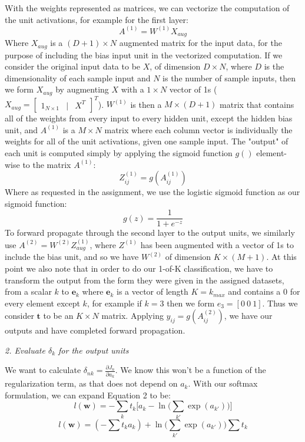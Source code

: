 \documentclass[10pt]{article}
\begin{document}
With the weights represented as matrices, we can vectorize the computation of the unit activations, for example for the first layer:
%
%
\begin{equation}
A^{(1)} = W^{(1)} X_{aug}
\end{equation}
%
%
Where $X_{aug}$ is a $(D+1) \times N$ augmented matrix for the input data, for the purpose of including the bias input unit in the vectorized computation.  If we consider the original input data to be $X$, of dimension $D \times N$, where $D$ is the dimensionality of each sample input and $N$ is the number of sample inputs, then we form $X_{aug}$ by augmenting $X$ with a $1 \times N$ vector of 1s ($X_{aug} = \begin{bmatrix} 1_{N \times 1} &| & X^T\end{bmatrix} ^T$).  $W^{(1)}$ is then a $M \times (D+1)$ matrix that contains all of the weights from every input to every hidden unit, except the hidden bias unit, and $A^{(1)}$ is a $M \times N$ matrix where each column vector is individually the weights for all of the unit activations, given one sample input.  The "output" of each unit is computed simply by applying the sigmoid function $g()$ element-wise to the matrix $A^{(1)}$:
%
%
\begin{equation}
Z^{(1)}_{ij} = g(A^{(1)}_{ij})
\end{equation}
%
%
Where as requested in the assignment, we use the logistic sigmoid function as our sigmoid function:
%
%
\begin{equation}
g(z) = \frac{1}{1 + e^{-z}}
\end{equation}
%
%
To forward propagate through the second layer to the output units, we similarly use $A^{(2)} = W^{(2)} Z_{aug}^{(1)}$, where $Z^{(1)}$ has been augmented with a vector of 1s to include the bias unit, and so we have $W^{(2)}$ of dimension $K \times (M+1)$.  At this point we also note that in order to do our 1-of-K classification, we have to transform the output from the form they were given in the assigned datasets, from a scalar $k$ to $\mathbf{e}_k$ where $\mathbf{e}_k$ is a vector of length $K = k_{max}$ and contains a 0 for every element except $k$, for example if $k=3$ then we form $e_3 = [0 \ 0 \  1]$.  Thus we consider $\mathbf{t}$ to be an $K \times N$ matrix.  Applying $y_{ij} = g(A^{(2)}_{ij})$, we have our outputs and have completed forward propagation.

\textit{2. Evaluate $\delta_k$ for the output units}

We want to calculate $\delta_{nk} = \frac{\partial J_n}{\partial a_k}$.  We know this won't be a function of the regularization term, as that does not depend on $a_k$.  With our softmax formulation, we can expand Equation 2 to be:
%
%
\begin{equation}
l(\mathbf{w}) = - \sum_k t_k \big[ a_k - \ln \big( \sum_{k'} \exp(a_{k'}) \big) \big]
\end{equation}
%
%
%
%
\begin{equation}
l(\mathbf{w}) = (- \sum t_k a_k) + \ln \big( \sum_{k'} \exp(a_{k'}) \big) \sum t_k
\end{equation}
%
%
\end{document}
